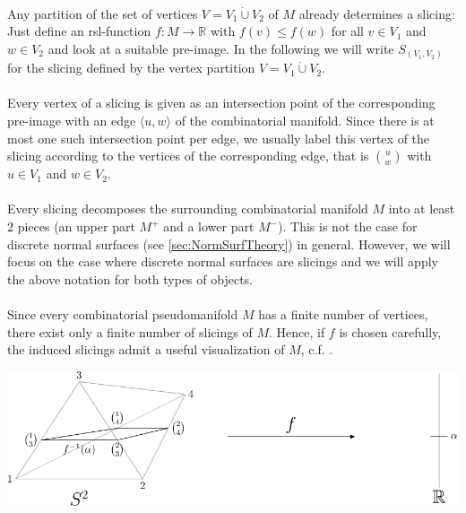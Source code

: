 \documentclass[a4paper,11pt]{report}
\begin{document}
{{\\
 Any partition of the set of vertices $V = V_1 \dot{\cup} V_2 $ of $M$ already determines a slicing: Just define an rsl-function $f: M \to \mathbb{R}$ with $f(v) \leq f(w)$ for all $v \in V_1$ and $w \in V_2$ and look at a suitable pre-image. In the following we will write $S_{(V_1,V_2)}$ for the slicing defined by the vertex partition $V = V_1 \dot{\cup} V_2 $.\\
\\
 Every vertex of a slicing is given as an intersection point of the
corresponding pre-image with an edge $\langle u,w \rangle$ of the combinatorial manifold. Since there is at most one such intersection
point per edge, we usually label this vertex of the slicing according to the
vertices of the corresponding edge, that is $\binom{u}{w}$ with $u \in V_1$ and $w \in V_2$.\\
\\
 Every slicing decomposes the surrounding combinatorial manifold $M$ into at least $2$ pieces (an upper part $M^+$ and a lower part $M^-$). This is not the case for discrete normal surfaces (see \ref{sec:NormSurfTheory}) in general. However, we will focus on the case where discrete normal
surfaces are slicings and we will apply the above notation for both types of
objects.\\
\\
 Since every combinatorial pseudomanifold $M$ has a finite number of vertices, there exist only a finite number of slicings
of $M$. Hence, if $f$ is chosen carefully, the induced slicings admit a useful visualization of $M$, c.f. \cite{Spreer09CombPorpsOfK3}.

  \medskip  

  \begin{center}
\includegraphics[width=.8\textwidth]{figures/slicing.pdf}\\ \end{center}  

}}
\end{document}
